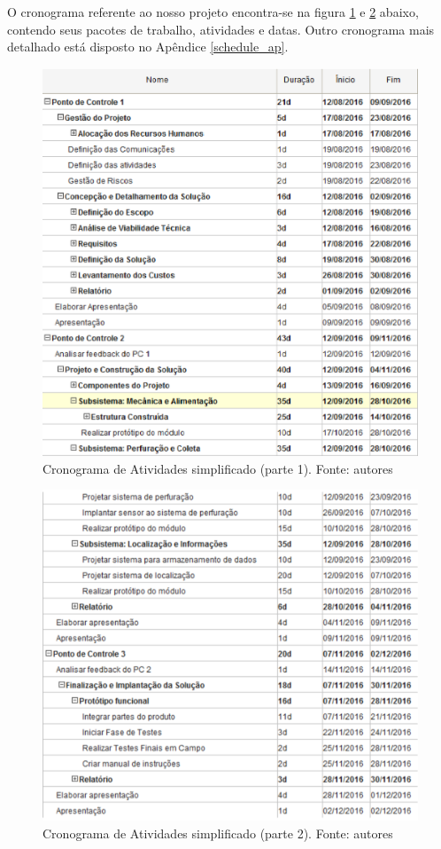       O cronograma referente ao nosso projeto encontra-se na figura \ref{fig:cron_s1}
      e \ref{fig:cron_s2} abaixo, contendo seus pacotes de trabalho, atividades e datas. Outro
      cronograma mais detalhado está disposto no Apêndice \ref{schedule_ap}. 

      \begin{figure}[!htbp]
        \centering
        \includegraphics[width=\textwidth]{figuras/cronograma_simples_1.eps}
        \caption{Cronograma de Atividades simplificado (parte 1). Fonte: autores}
        \label{fig:cron_s1}
      \end{figure}

      \begin{figure}[!htbp]
        \centering
        \includegraphics[width=\textwidth]{figuras/cronograma_simples_2.eps}
        \caption{Cronograma de Atividades simplificado (parte 2). Fonte: autores}
        \label{fig:cron_s2}
      \end{figure}

